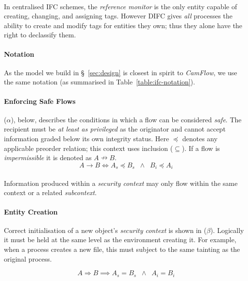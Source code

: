 \paragraph{} In centralised IFC schemes, the \textit{reference monitor} is the only entity capable of creating, changing, and assigning tags. However DIFC gives \textit{all} processes the ability to create and modify tags for entities they own; thus they alone have the right to declassify them.

\paragraph{Notation} As the model we build in §~\ref{sec:design} is closest in spirit to \textit{CamFlow}, we use the same notation (as summarised in Table~\ref{table:ifc-notation}).

\paragraph{Enforcing Safe Flows} ($\alpha$), below, describes the conditions in which a flow can be considered \textit{safe}. The recipient must be \textit{at least as privileged} as the originator and cannot accept information graded below its own integrity status. Here $\preceq$ denotes any applicable preorder relation; this context uses inclusion ($\subseteq$). If a flow is \textit{impermissible} it is denoted as $A \nrightarrow B$.
\begin{equation}
    A \rightarrow B \iff A_s \preceq B_s \;\; \land \;\; B_i \preceq A_i \tag{$\alpha$}
\end{equation}
\paragraph{} Information produced within a \textit{security context} may only flow within the same context or a related \textit{subcontext}.

\paragraph{Entity Creation} Correct initialisation of a new object's \textit{security context} is shown in ($\beta$). Logically it must be held at the same level as the environment creating it. For example, when a process creates a new file, this must subject to the same tainting as the original process.

\begin{equation}
    A \Rightarrow B \implies A_s = B_s \;\; \land \;\; A_i = B_i \tag{$\beta$}
\end{equation}

